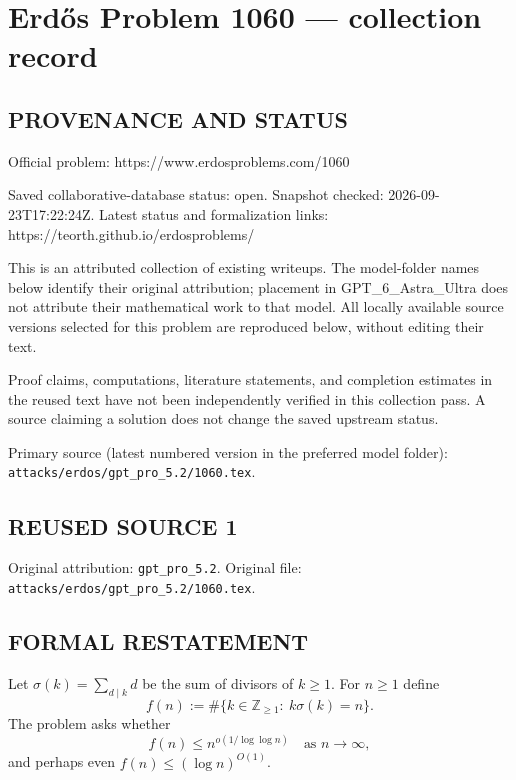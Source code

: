 \section*{Erd\H{o}s Problem 1060 --- collection record}

\subsection*{PROVENANCE AND STATUS}
Official problem: https://www.erdosproblems.com/1060

Saved collaborative-database status: open.
Snapshot checked: 2026-09-23T17:22:24Z.
Latest status and formalization links: https://teorth.github.io/erdosproblems/

This is an attributed collection of existing writeups. The model-folder names below identify their original attribution; placement in GPT\_6\_Astra\_Ultra does not attribute their mathematical work to that model. All locally available source versions selected for this problem are reproduced below, without editing their text.

Proof claims, computations, literature statements, and completion estimates in the reused text have not been independently verified in this collection pass. A source claiming a solution does not change the saved upstream status.

Primary source (latest numbered version in the preferred model folder): \texttt{attacks/erdos/gpt\_pro\_5.2/1060.tex}.

\subsection*{REUSED SOURCE 1}
Original attribution: \texttt{gpt\_pro\_5.2}.
Original file: \texttt{attacks/erdos/gpt\_pro\_5.2/1060.tex}.


\subsection*{FORMAL RESTATEMENT}
Let $\sigma(k)=\sum_{d\mid k} d$ be the sum of divisors of $k\ge 1$. For $n\ge 1$ define
\[
f(n):=\#\{k\in\mathbb Z_{\ge 1}:\ k\sigma(k)=n\}.
\]
The problem asks whether
\[
f(n)\le n^{o(1/\log\log n)}\quad\text{as }n\to\infty,
\]
and perhaps even $f(n)\le (\log n)^{O(1)}$.

